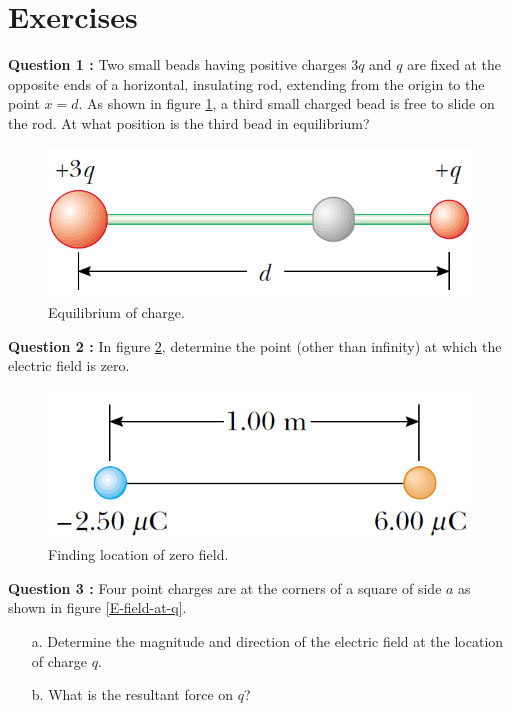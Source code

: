 \documentclass[12pt,a4paper]{article}
\begin{document}
\section{Exercises}
\noindent\textbf{Question 1 \cite[Problem 10, page 731]{Serway}:} Two small beads having positive charges $3q$ and $q$ are fixed at the opposite ends of a horizontal, insulating rod, extending from the origin to the point $x=d$. As shown in figure \ref{Equilibrium}, a third small charged bead is free to slide on the rod. At what position is the third bead in equilibrium?
\begin{figure}[H]
\centering
\includegraphics[scale=0.45]{FigureP23-10.png}
\caption{Equilibrium of charge.}
\label{Equilibrium}
\end{figure}
\noindent\textbf{Question 2 \cite[Problem 15, page 731]{Serway}:} In figure \ref{Electric-field-zero}, determine the point (other than infinity) at which the electric field is zero.
\begin{figure}[H]
\centering
\includegraphics[scale=0.45]{FigureP23-15.png}
\caption{Finding location of zero field.}
\label{Electric-field-zero}
\end{figure}
\newpage
\noindent\textbf{Question 3 \cite[Problem 21, page 732]{Serway}:} Four point charges are at the corners of a square of side $a$ as shown in figure \ref{E-field-at-q}.
\begin{itemize}
\item[a.] Determine the magnitude and direction of the electric field at the location of charge $q$.
\item[b.] What is the resultant force on $q$?
\end{itemize}
\end{document}
